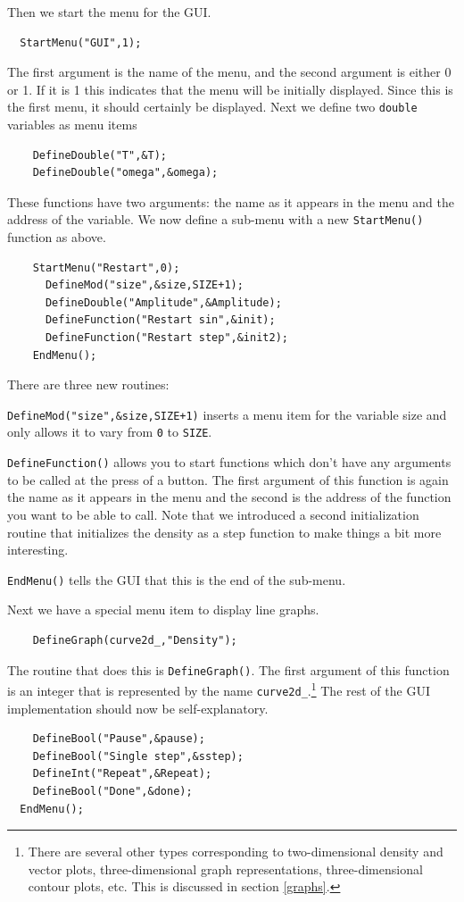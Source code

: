 \documentclass[12pt,letterpaper]{article}
\begin{document}
Then we start the menu for the GUI.
\begin{verbatim}
  StartMenu("GUI",1);
\end{verbatim}
The first argument is the name of the menu, and the second argument is
either 0 or 1. If it is 1 this indicates that the menu will be
initially displayed. Since this is the first menu, it should certainly
be displayed. Next we define two \texttt{double} variables as menu
items
\begin{verbatim} 
    DefineDouble("T",&T);
    DefineDouble("omega",&omega);
\end{verbatim}
These functions have two arguments: the name as it appears in the menu
and the address of the variable. We now define a sub-menu with a new
\texttt{StartMenu()} function as above.
\begin{verbatim}
    StartMenu("Restart",0);
      DefineMod("size",&size,SIZE+1);
      DefineDouble("Amplitude",&Amplitude);
      DefineFunction("Restart sin",&init);
      DefineFunction("Restart step",&init2);
    EndMenu();
\end{verbatim}
There are three new routines: 
\begin{description}
\item{\texttt{DefineMod("size",\&size,SIZE+1)}} inserts a menu item for
  the variable size and only allows it to vary from \texttt{0} to
  \texttt{SIZE}. 
\item{\texttt{DefineFunction()}} allows you to
start functions which don't have any arguments to be called at the
press of a button. The first argument of this function is again the
name as it appears in the menu and the second is the address of the
function you want to be able to call. Note that we introduced a second
initialization routine that initializes the density as a step function
to make things a bit more interesting.
\item{\texttt{EndMenu()}} tells the GUI that this is the end of the
sub-menu.
\end{description}
Next we have a special menu item to display line graphs.
\begin{verbatim}
    DefineGraph(curve2d_,"Density");
\end{verbatim}
The routine that does this is \texttt{DefineGraph()}. The first
argument of this function is an integer that is represented by the name
\texttt{curve2d\_}.\footnote{There are several other types corresponding
  to two-dimensional density and vector plots, three-dimensional graph
  representations, three-dimensional contour plots, etc. This is
  discussed in section \ref{graphs}.} 
The rest of the GUI implementation should now be self-explanatory.
\begin{verbatim}
    DefineBool("Pause",&pause);
    DefineBool("Single step",&sstep);
    DefineInt("Repeat",&Repeat);    
    DefineBool("Done",&done);
  EndMenu();
\end{verbatim}
\end{document}
